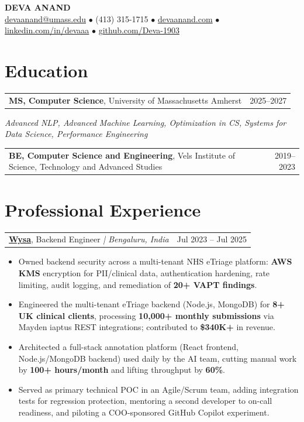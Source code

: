 \documentclass[letterpaper,11pt]{article}
\makeatletter
\newcommand{\eduItem}[3]{%
  \begin{tabular*}{\textwidth}{@{}l@{\extracolsep{\fill}}r@{}}
    \textbf{#1}, #2 & #3 \\
  \end{tabular*}\par
}
\newcommand{\expItem}[4]{%
  \vspace{3pt}
  \begin{tabular*}{\textwidth}{@{}l@{\extracolsep{\fill}}r@{}}
    \textbf{#1}, #2 \textit{| #3} & #4 \\
  \end{tabular*}\par\vspace{-2pt}
}
\makeatother
\begin{document}
\begin{center}
    {\fontsize{18}{20}\selectfont\bfseries DEVA ANAND}\\ \vspace{3pt}
    {\small
    \href{mailto:devaanand@umass.edu}{devaanand@umass.edu}
    \enspace$\bullet$\enspace
    (413) 315-1715
    \enspace$\bullet$\enspace
    \href{https://devaanand.com}{devaanand.com}
    \enspace$\bullet$\enspace
    \href{https://linkedin.com/in/devaaa/}{linkedin.com/in/devaaa}
    \enspace$\bullet$\enspace
    \href{https://github.com/Deva-1903}{github.com/Deva-1903}}
\end{center}
\vspace{-6pt}

\section{Education}
\eduItem{MS, Computer Science}{University of Massachusetts Amherst}{2025--2027}
{\small\textit{Advanced NLP, Advanced Machine Learning, Optimization in CS, Systems for Data Science, Performance Engineering}}\par
\vspace{3pt}
\eduItem{BE, Computer Science and Engineering}{Vels Institute of Science, Technology and Advanced Studies}{2019--2023}

\section{Professional Experience}

\expItem{\href{https://www.wysa.io}{Wysa}}{Backend Engineer}{Bengaluru, India}{Jul 2023 -- Jul 2025}
\begin{itemize}
  \item Owned backend security across a multi-tenant NHS eTriage platform: \textbf{AWS KMS} encryption for PII/clinical data, authentication hardening, rate limiting, audit logging, and remediation of \textbf{20+ VAPT findings}.
  \item Engineered the multi-tenant eTriage backend (Node.js, MongoDB) for \textbf{8+ UK clinical clients}, processing \textbf{10{,}000+ monthly submissions} via Mayden iaptus REST integrations; contributed to \textbf{\$340K+} in revenue.
  \item Architected a full-stack annotation platform (React frontend, Node.js/MongoDB backend) used daily by the AI team, cutting manual work by \textbf{100+ hours/month} and lifting throughput by \textbf{60\%}.
  \item Served as primary technical POC in an Agile/Scrum team, adding integration tests for regression protection, mentoring a second developer to on-call readiness, and piloting a COO-sponsored GitHub Copilot experiment.
\end{itemize}
\end{document}
